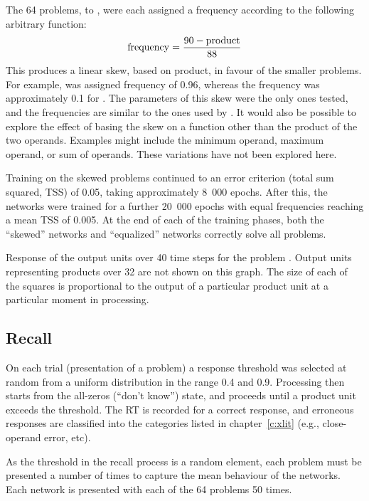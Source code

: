 The 64 problems,  to , were each assigned a frequency according to
the following arbitrary function:
$$ {\rm frequency} = \frac{90-{\rm product}}{88} $$
This produces a linear skew, based on product, in favour of the smaller
problems. For example,  was assigned frequency of 0.96, whereas the
frequency was approximately 0.1 for .
The parameters of this skew were the only ones tested, and the
frequencies are similar to the ones used by .  It would
also be possible to explore the effect of basing the skew on a function
other than the product of the two operands. Examples might include the
minimum operand, maximum operand, or sum of operands.  These variations have
not been explored here.

Training on the skewed problems continued to an error
criterion (total sum squared, TSS) of 0.05, taking approximately 8~000
epochs. After this, the networks were trained for a further 20~000 epochs
with equal frequencies reaching a mean TSS of 0.005.  At the end of each
of the training phases, both the ``skewed'' networks and ``equalized''
networks correctly solve all problems.


\begin{fancyfigure}
\centerline{}
\caption{Response of the output units over 40 time steps for the problem
.  Output units representing products over 32 are not shown on this
graph.  The size of each of the squares is proportional to the output of a
particular product unit at a particular moment in processing.}
\label{f:actplot}
\end{fancyfigure}



\subsection{Recall}

On each trial (presentation of a problem) a response
threshold was selected at random from a uniform distribution in
the range 0.4 and 0.9.
Processing then starts from the
all-zeros (``don't know'') state, and proceeds until a product unit exceeds
the threshold. The RT is recorded for a correct
response, and erroneous responses are classified into the categories listed
in chapter~\ref{c:xlit} (e.g., close-operand error, etc).

As the threshold in the recall process is a random element, each problem
must be presented a number of times to capture the mean behaviour of the
networks. Each network is presented with each of the 64 problems 50 times.

